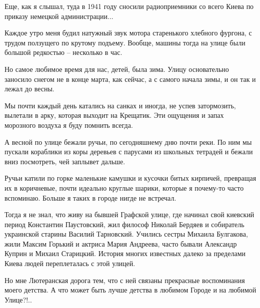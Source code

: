 Еще, как я слышал, туда в 1941 году сносили радиоприемники со всего Киева по
приказу немецкой администрации...

Каждое утро меня будил натужный звук мотора старенького хлебного фургона, с
трудом ползущего по крутому подъему. Вообще, машины тогда на улице были большой
редкостью – несколько в час.

Но самое любимое время для нас, детей, была зима. Улицу основательно заносило
снегом не в конце марта, как сейчас, а с самого начала зимы, и он так и лежал
до весны.


Мы почти каждый день катались на санках и иногда, не успев затормозить,
вылетали в арку, которая выходит на Крещатик. Эти ощущения и запах морозного
воздуха я буду помнить всегда.

А весной по улице бежали ручьи, по сегодняшнему дню почти реки. По ним мы
пускали кораблики из коры деревьев с парусами из школьных тетрадей и бежали
вниз посмотреть, чей заплывет дальше.

Ручьи катили по горке маленькие камушки и кусочки битых кирпичей, превращая их
в коричневые, почти идеально круглые шарики, которые я почему-то часто
вспоминаю. Больше я таких в городе нигде не встречал.

Тогда я не знал, что живу на бывшей Графской улице, где начинал свой киевский
период Константин Паустовский, жил философ Николай Бердяев и собиратель
украинской старины Василий Тарновский. Учились сестры Михаила Булгакова, жили
Максим Горький и актриса Мария Андреева, часто бывали Александр Куприн и Михаил
Старицкий. История многих известных далеко за пределами Киева людей
переплеталась с этой улицей.

Но мне Лютеранская дорога тем, что с ней связаны прекрасные воспоминания моего
детства. А что может быть лучше детства в любимом Городе и на любимой Улице?!..

